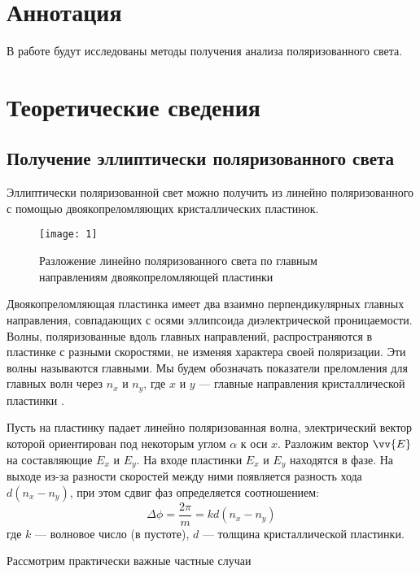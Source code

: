 \documentclass[a4paper, 12pt]{article}
\begin{document}

\section{Аннотация}
В работе будут исследованы методы получения анализа поляризованного
света.






\section{Теоретические сведения}
\subsection*{Получение эллиптически поляризованного света}
Эллиптически поляризованной свет можно получить из линейно
поляризованного с помощью двоякопреломляющих кристаллических
пластинок.

\begin{wrapfigure}{r}{0.3\linewidth}
    \texttt{[image: 1]}
    \caption{Разложение линейно поляризованного света по главным
    направлениям двоякопреломляющей пластинки}
    \label{fig:1}
\end{wrapfigure}

Двоякопреломляющая пластинка имеет два взаимно перпендикулярных
главных направления, совпадающих с осями эллипсоида диэлектрической
проницаемости. Волны, поляризованные вдоль главных направлений,
распространяются в пластинке с разными скоростями, не изменяя
характера своей поляризации. Эти волны называются главными. Мы будем
обозначать показатели преломления для главных волн через $n_x$ и
$n_y$, где $x$ и $y$ --- главные направления кристаллической пластинки
.

Пусть на пластинку падает линейно поляризованная волна, электрический
вектор которой ориентирован под некоторым углом $\alpha$ к оси $x$.
Разложим вектор $\vv{E}$ на составляющие $E_x$ и $E_y$. На входе
пластинки $E_x$ и $E_y$ находятся в фазе. На выходе из-за разности
скоростей между ними появляется разность хода $d(n_x-n_y)$, при этом
сдвиг фаз определяется соотношением:
\begin{equation}
    \Delta \phi = \frac{2\pi}{m}= kd(n_x-n_y)
    \label{eq:1}
\end{equation}
где $k$ --- волновое число (в пустоте), $d$ --- толщина
кристаллической пластинки.

Рассмотрим практически важные частные случаи
\end{document}
